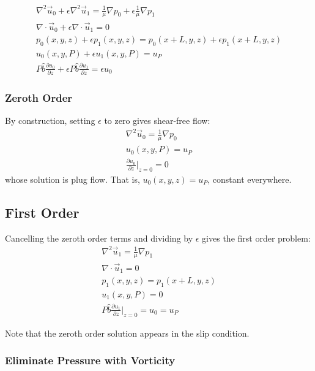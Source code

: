 \documentclass[12pt, a4paper, twoside, openright]{book}
\begin{document}
\begin{gather}
\nabla^2 \vec{u}_0 + \epsilon \nabla^2 \vec{u}_1 =
 \frac{1}{\mu} \nabla p_0 + \epsilon \frac{1}{\mu} \nabla p_1 \\
\nabla \cdot \vec{u}_0 + \epsilon \nabla \cdot \vec{u}_1 = 0  \\
p_0(x,y,z) + \epsilon p_1(x,y,z) = p_0(x+L,y,z) + \epsilon p_1(x+L,y,z) \\
u_0(x,y,P) + \epsilon u_1(x,y,P) = u_P \\ 
 P \hat{b} \frac{\partial u_0}{\partial z}  +
  \epsilon  P \hat{b} \frac{\partial u_1}{\partial z}
= \epsilon u_0
\end{gather}


\subsubsection*{Zeroth Order}

By construction, setting $\epsilon$ to zero gives shear-free flow:
\begin{gather}
\nabla^2 \vec{u}_0  = \frac{1}{\mu} \nabla p_0 \\
u_0(x,y,P) = u_P \\ 
\frac{\partial u_0}{\partial z} \rvert_{z=0} = 0
\end{gather}
whose solution is plug flow.  That is, $u_0(x,y,z) = u_P$, constant everywhere.

\subsection*{First Order}

Cancelling the zeroth order terms and dividing by $\epsilon$ gives the first order problem:
\begin{gather}
\nabla^2 \vec{u}_1 = \frac{1}{\mu} \nabla p_1 \\
\nabla \cdot \vec{u}_1 = 0  \\
p_1(x,y,z) = p_1(x+L,y,z) \\
u_1(x,y,P) = 0 \\ 
P \hat{b} \frac{\partial u_1}{\partial z} \rvert_{z=0} = u_0 =  u_P
\end{gather}

Note that the zeroth order solution appears in the slip condition.

\subsubsection*{Eliminate Pressure with Vorticity}
\end{document}

